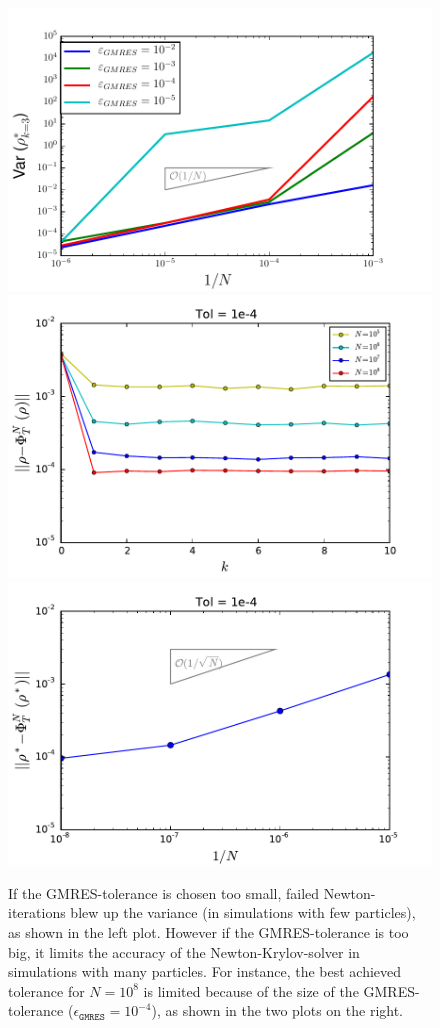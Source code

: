 \begin{figure}[H!]
\centering
\includegraphics[width=0.32\linewidth]{../Problems/WeightedParticles/checkSystem/plots/Variance_3th_newton_it_Dt1e-1}
\includegraphics[width=0.32\linewidth]{../Problems/WeightedParticles/checkSystem/Newton/plots/Newton_sde_res(k)_Dt_e-2_tol1e-4}
\includegraphics[width=0.32\linewidth]{../Problems/WeightedParticles/checkSystem/Newton/plots/Tolerance_on_NK-solution_converges_N-1_tol_1e-4}

\caption{If the GMRES-tolerance is chosen too small, failed Newton-iterations blew up the variance (in simulations with few particles), as shown in the left plot. However if the GMRES-tolerance is too big, it limits the accuracy of the Newton-Krylov-solver in simulations with many particles. For instance, the best achieved tolerance for $N=10^8$ is limited because of the size of the GMRES-tolerance ($\epsilon_{\texttt{GMRES}}=10^{-4}$), as shown in the two plots on the right.}
\label{fig:Newton_sde_res(k)_tol1e-4}
\end{figure}







%
%
%

